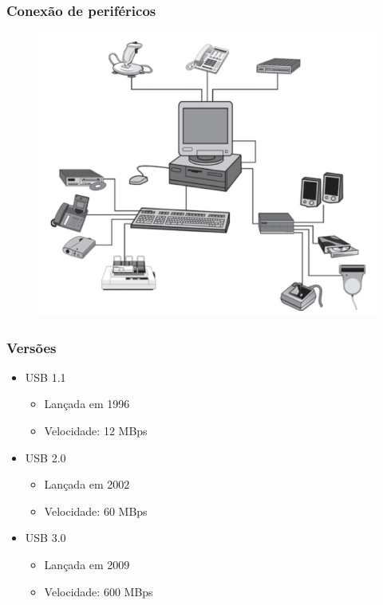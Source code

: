 \documentclass[aspectratio=169,
				xcolor=table]{beamer}
\begin{document}
	\begin{frame}
		\frametitle{Conexão de periféricos}
		\begin{figure}[hbtp]
		\centering
		\includegraphics[height=.75\textheight]{../figs/cap11/usb.png}
		\end{figure}
		
	\end{frame}
	
	\begin{frame}
		\frametitle{Versões}
		\begin{itemize}
			\item USB 1.1
			\begin{itemize}
				\item Lançada em 1996
				\item Velocidade: 12 MBps
			\end{itemize}
			\vspace{1em}
			\item USB 2.0
			\begin{itemize}
				\item Lançada em 2002
				\item Velocidade: 60 MBps
			\end{itemize}
			\vspace{1em}
			\item USB 3.0
			\begin{itemize}
				\item Lançada em 2009
				\item Velocidade: 600 MBps
			\end{itemize}
		\end{itemize}
	\end{frame}
\end{document}
